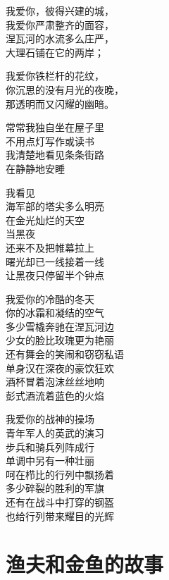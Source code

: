 \documentclass[
]{book}
\renewenvironment{quote}{\begin{VF}}{\end{VF}}
\begin{document}
\begin{quote}
我爱你，彼得兴建的城，\\
我爱你严肃整齐的面容，\\
涅瓦河的水流多么庄严，\\
大理石铺在它的两岸；

我爱你铁栏杆的花纹，\\
你沉思的没有月光的夜晚，\\
那透明而又闪耀的幽暗。

常常我独自坐在屋子里\\
不用点灯写作或读书\\
我清楚地看见条条街路\\
在静静地安睡

我看见\\
海军部的塔尖多么明亮\\
在金光灿烂的天空\\
当黑夜\\
还来不及把帷幕拉上\\
曙光却已一线接着一线\\
让黑夜只停留半个钟点

我爱你的冷酷的冬天\\
你的冰霜和凝结的空气\\
多少雪橇奔驰在涅瓦河边\\
少女的脸比玫瑰更为艳丽\\
还有舞会的笑闹和窃窃私语\\
单身汉在深夜的豪饮狂欢\\
酒杯冒着泡沫丝丝地响\\
彭式酒流着蓝色的火焰

我爱你的战神的操场\\
青年军人的英武的演习\\
步兵和骑兵列阵成行\\
单调中另有一种壮丽\\
呵在栉比的行列中飘扬着\\
多少碎裂的胜利的军旗\\
还有在战斗中打穿的钢盔\\
也给行列带来耀目的光辉
\end{quote}

\hypertarget{section-53}{%
\section{渔夫和金鱼的故事}\label{section-53}}
\end{document}
